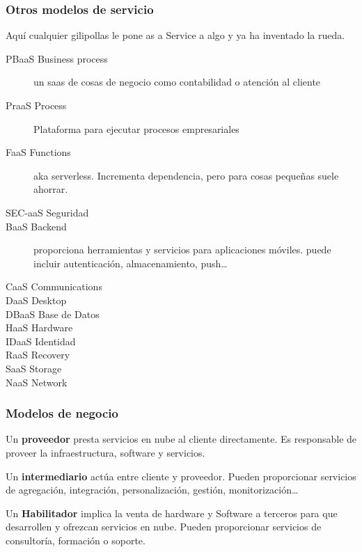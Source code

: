     \subsubsection{Otros modelos de servicio}
        Aquí cualquier gilipollas le pone as a Service a algo y ya ha inventado la rueda.
        \begin{description}
            \item[PBaaS Business process] un saas de cosas de negocio como contabilidad o atención al cliente
            \item[PraaS Process] Plataforma para ejecutar procesos empresariales
            \item[FaaS Functions] aka serverless. Incrementa dependencia, pero para cosas pequeñas suele ahorrar.
            \item[SEC-aaS Seguridad]
            \item[BaaS Backend] proporciona herramientas y servicios para aplicaciones móviles. puede incluir autenticación, almacenamiento, push\dots
            \item[CaaS Communications]
            \item[DaaS Desktop]
            \item[DBaaS Base de Datos] 
            \item[HaaS Hardware]
            \item[IDaaS Identidad]
            \item[RaaS Recovery]
            \item[SaaS Storage]
            \item[NaaS Network]
        \end{description}

    \subsubsection{Modelos de negocio}
        Un \textbf{proveedor} presta servicios en nube al cliente directamente. Es responsable de proveer la infraestructura, software y servicios.

        Un \textbf{intermediario} actúa entre cliente y proveedor. Pueden proporcionar servicios de agregación, integración, personalización, gestión, monitorización\dots

        Un \textbf{Habilitador} implica la venta de hardware y Software a terceros para que desarrollen y ofrezcan servicios en nube. Pueden proporcionar servicios de consultoría, formación o soporte.

